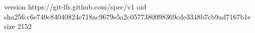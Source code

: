 version https://git-lfs.github.com/spec/v1
oid sha256:c6e740c84040824e718ac9679e5a2c0577380098369cde3348b7cb9ad7167b1e
size 2152
